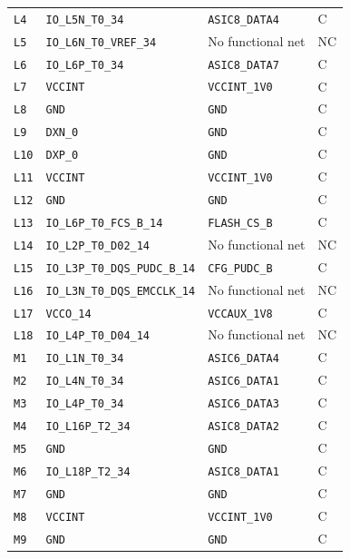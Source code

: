 \documentclass[10pt,a4paper]{article}
\begin{document}
\begin{longtable}{@{}P{15mm}P{42mm}P{92mm}P{10mm}@{}}
\nolinkurl{L4} & \nolinkurl{IO_L5N_T0_34} & \nolinkurl{ASIC8_DATA4} & C \\
\nolinkurl{L5} & \nolinkurl{IO_L6N_T0_VREF_34} & No functional net & NC \\
\nolinkurl{L6} & \nolinkurl{IO_L6P_T0_34} & \nolinkurl{ASIC8_DATA7} & C \\
\nolinkurl{L7} & \nolinkurl{VCCINT} & \nolinkurl{VCCINT_1V0} & C \\
\nolinkurl{L8} & \nolinkurl{GND} & \nolinkurl{GND} & C \\
\nolinkurl{L9} & \nolinkurl{DXN_0} & \nolinkurl{GND} & C \\
\nolinkurl{L10} & \nolinkurl{DXP_0} & \nolinkurl{GND} & C \\
\nolinkurl{L11} & \nolinkurl{VCCINT} & \nolinkurl{VCCINT_1V0} & C \\
\nolinkurl{L12} & \nolinkurl{GND} & \nolinkurl{GND} & C \\
\nolinkurl{L13} & \nolinkurl{IO_L6P_T0_FCS_B_14} & \nolinkurl{FLASH_CS_B} & C \\
\nolinkurl{L14} & \nolinkurl{IO_L2P_T0_D02_14} & No functional net & NC \\
\nolinkurl{L15} & \nolinkurl{IO_L3P_T0_DQS_PUDC_B_14} & \nolinkurl{CFG_PUDC_B} & C \\
\nolinkurl{L16} & \nolinkurl{IO_L3N_T0_DQS_EMCCLK_14} & No functional net & NC \\
\nolinkurl{L17} & \nolinkurl{VCCO_14} & \nolinkurl{VCCAUX_1V8} & C \\
\nolinkurl{L18} & \nolinkurl{IO_L4P_T0_D04_14} & No functional net & NC \\
\nolinkurl{M1} & \nolinkurl{IO_L1N_T0_34} & \nolinkurl{ASIC6_DATA4} & C \\
\nolinkurl{M2} & \nolinkurl{IO_L4N_T0_34} & \nolinkurl{ASIC6_DATA1} & C \\
\nolinkurl{M3} & \nolinkurl{IO_L4P_T0_34} & \nolinkurl{ASIC6_DATA3} & C \\
\nolinkurl{M4} & \nolinkurl{IO_L16P_T2_34} & \nolinkurl{ASIC8_DATA2} & C \\
\nolinkurl{M5} & \nolinkurl{GND} & \nolinkurl{GND} & C \\
\nolinkurl{M6} & \nolinkurl{IO_L18P_T2_34} & \nolinkurl{ASIC8_DATA1} & C \\
\nolinkurl{M7} & \nolinkurl{GND} & \nolinkurl{GND} & C \\
\nolinkurl{M8} & \nolinkurl{VCCINT} & \nolinkurl{VCCINT_1V0} & C \\
\nolinkurl{M9} & \nolinkurl{GND} & \nolinkurl{GND} & C \\

\end{longtable}
\end{document}
